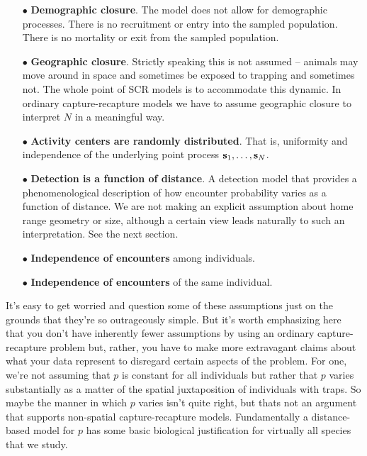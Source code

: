 \begin{itemize}
\item[$\bullet$] {\bf Demographic closure}. The model does not allow for demographic processes.
There is no recruitment or entry into the sampled population. There is
no mortality or exit from the sampled population.
\item[$\bullet$] {\bf Geographic closure}.
 Strictly speaking this is not assumed -- animals may move around in
 space and sometimes be exposed to trapping and sometimes not. The
 whole point of SCR models is to accommodate this dynamic. In ordinary
 capture-recapture models we have to assume geographic closure to interpret $N$ in a
 meaningful way.
\item[$\bullet$] {\bf Activity centers are randomly distributed}. That
  is, uniformity and independence of the underlying point
  process ${\bf s}_{1},\ldots, {\bf s}_{N}$.
\item[$\bullet$] {\bf Detection is a function of distance}.
A detection model that provides a phenomenological
  description of how encounter probability varies as a function of distance.
 We are not making an explicit assumption about home range geometry or
 size, although a certain view leads naturally to such an
 interpretation. See the next section.
\item[$\bullet$] {\bf Independence of encounters} among individuals.
\item[$\bullet$] {\bf Independence of encounters} of the same individual.
\end{itemize}
It's easy to get worried and question some of these assumptions just on
the grounds that they're so outrageously simple. But it's worth
emphasizing here that you don't have inherently fewer assumptions by
using an ordinary capture-recapture problem but, rather, you have to
make more extravagant claims about what your data represent to
disregard certain aspects of the problem.  For one, we're not
assuming that $p$ is constant for all individuals but rather that $p$
varies substantially as a matter of the spatial juxtaposition of
individuals with traps. So maybe the manner in which $p$ varies isn't
quite right, but thats not an argument that supports non-spatial
capture-recapture models.
 Fundamentally a
distance-based model for $p$ has some basic biological justification
for virtually all species that we study.

